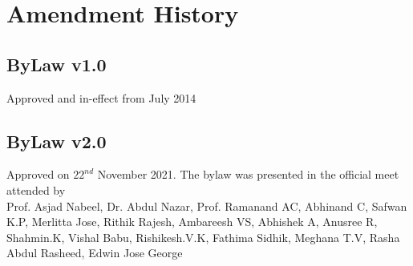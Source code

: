 \section{Amendment History}
\subsection{ByLaw v1.0}
	Approved and in-effect from July 2014
\subsection{ByLaw v2.0}
	Approved on $22^{nd}$ November 2021. The bylaw was presented in the official meet attended by \\
	Prof. Asjad Nabeel, Dr. Abdul Nazar, Prof. Ramanand AC, Abhinand C, Safwan K.P, Merlitta Jose, Rithik Rajesh, Ambareesh VS, Abhishek A, Anusree R, Shahmin.K, Vishal Babu, Rishikesh.V.K, Fathima Sidhik, Meghana T.V, Rasha Abdul Rasheed, Edwin Jose George
